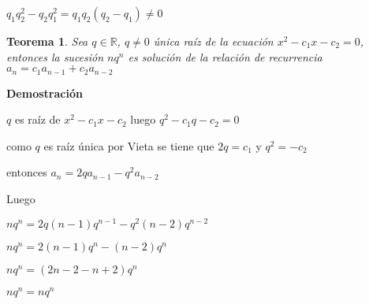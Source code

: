 \documentclass[a4paper,12pt]{report}
\newtheorem*{teo}{Teorema}
\begin{document}
$q_1q^2_2-q_2q^2_1=q_1q_2(q_2-q_1)\neq0$




\begin{teo}
 Sea $q\in\mathbb{R}$, $q\neq 0$ única raíz de la ecuación $x^2-c_1x-c_2=0$, entonces la sucesión $nq^n$  es solución de la relación de recurrencia $a_n=c_1a_{n-1}+c_2a_{n-2}$
\end{teo}

\textbf{Demostración}

$q$ es raíz de $x^2-c_1x-c_2$ luego $q^2-c_1q-c_2=0$

como $q$ es raíz única por Vieta se tiene que $2q=c_1$ y $q^2=-c_2$

entonces $a_n=2qa_{n-1}-q^2a_{n-2}$

Luego 

$nq^n=2q(n-1)q^{n-1}-q^2(n-2)q^{n-2}$

$nq^n=2(n-1)q^{n}-(n-2)q^{n}$

$nq^n=(2n-2-n+2)q^{n}$

$nq^n=nq^n$
   
\end{document}
